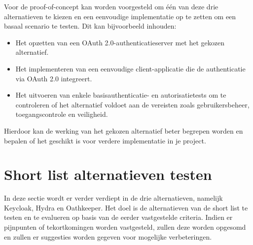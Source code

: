 Voor de proof-of-concept kan worden voorgesteld om één van deze drie alternatieven te kiezen en een eenvoudige implementatie op te zetten om een basaal scenario te testen. Dit kan bijvoorbeeld inhouden:

\begin{itemize}
    \item Het opzetten van een OAuth 2.0-authenticatieserver met het gekozen alternatief.
    \item Het implementeren van een eenvoudige client-applicatie die de authenticatie via OAuth 2.0 integreert.
    \item Het uitvoeren van enkele basisauthenticatie- en autorisatietests om te controleren of het alternatief voldoet aan de vereisten zoals gebruikersbeheer, toegangscontrole en veiligheid.
\end{itemize}

Hierdoor kan de werking van het gekozen alternatief beter begrepen worden en bepalen of het geschikt is voor verdere implementatie in je project.


\section{Short list alternatieven testen}
\label{subsec:short-list-alternatieven-testen}
In deze sectie wordt er verder verdiept in de drie alternatieven, namelijk Keycloak, Hydra en Oathkeeper.
Het doel is de alternatieven van de short list te testen en te evalueren op basis van de eerder vastgestelde criteria. Indien er pijnpunten of tekortkomingen worden vastgesteld, zullen deze worden opgesomd en zullen er suggesties worden gegeven voor mogelijke verbeteringen.

